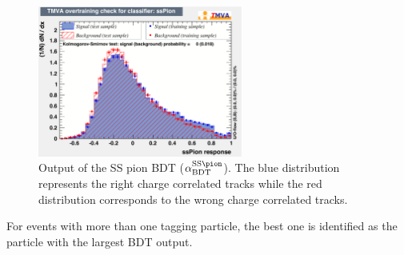 \begin{figure}[tbp]
	\begin{center}
		\includegraphics[width=0.6\textwidth]{08FlavourTagging/figs/SSPionBDT_overtrain.pdf}
	\end{center}
	\caption{Output of the SS pion BDT ($\alpha^{\text{SS}\pion}_\text{BDT}$).
	The blue distribution represents the right charge correlated tracks while the red distribution corresponds to the wrong charge correlated tracks.}
	\label{fig:BDTovertrainSSPion}
\end{figure}
For events with more than one tagging particle, the best one is identified as the particle with the largest BDT output.

